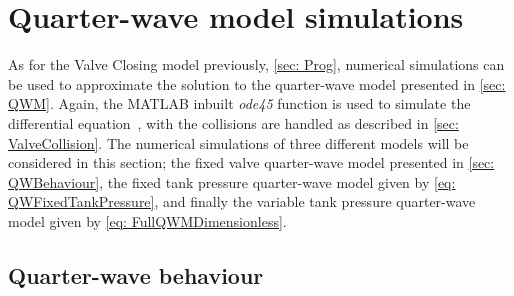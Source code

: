 \chapter{Quarter-wave model simulations} \label{sec: QWSim}

As for the Valve Closing model previously, \cref{sec: Prog}, numerical simulations can be used to approximate the solution to the quarter-wave model presented in \cref{sec: QWM}.
Again, the MATLAB inbuilt \textit{ode45} function is used to simulate the differential equation~\cite{Shampine1997TheSuite}, with the collisions are handled as described in \cref{sec: ValveCollision}. The numerical simulations of three different models will be considered in this section; the fixed valve quarter-wave model presented in \cref{sec: QWBehaviour}, the fixed tank pressure quarter-wave model given by \cref{eq: QWFixedTankPressure}, and finally the variable tank pressure quarter-wave model given by \cref{eq: FullQWMDimensionless}.

\section{Quarter-wave behaviour} \label{subsec: QWBehavSim}

